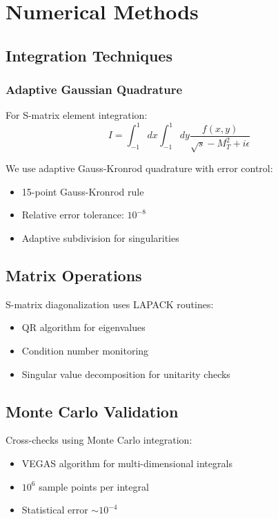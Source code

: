 \section{Numerical Methods}
\label{app:numerical}

\subsection{Integration Techniques}

\subsubsection{Adaptive Gaussian Quadrature}

For S-matrix element integration:
\begin{equation}
    I = \int_{-1}^1 dx \int_{-1}^1 dy \frac{f(x,y)}{\sqrt{s} - M_T^2 + i\epsilon}
\end{equation}

We use adaptive Gauss-Kronrod quadrature with error control:
\begin{itemize}
    \item 15-point Gauss-Kronrod rule
    \item Relative error tolerance: $10^{-8}$
    \item Adaptive subdivision for singularities
\end{itemize}

\subsection{Matrix Operations}

S-matrix diagonalization uses LAPACK routines:
\begin{itemize}
    \item QR algorithm for eigenvalues
    \item Condition number monitoring
    \item Singular value decomposition for unitarity checks
\end{itemize}

\subsection{Monte Carlo Validation}

Cross-checks using Monte Carlo integration:
\begin{itemize}
    \item VEGAS algorithm for multi-dimensional integrals
    \item $10^6$ sample points per integral
    \item Statistical error $\sim 10^{-4}$
\end{itemize}

